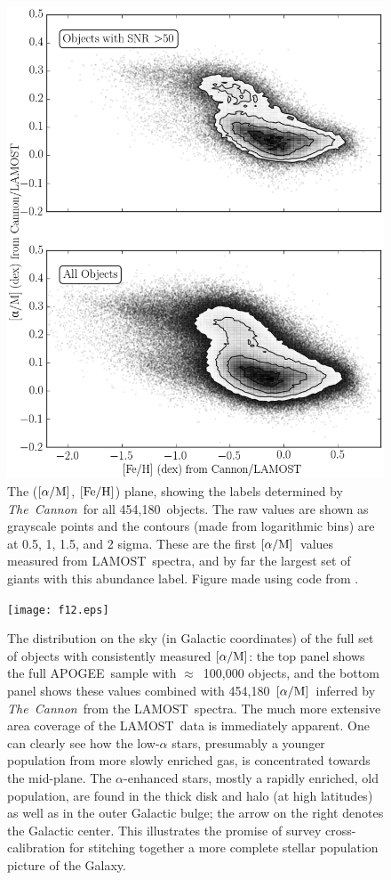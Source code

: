 \documentclass[12pt, letterpaper, preprint]{aastex}
\newcommand{\tc}{\textsl{The~Cannon}}
\newcommand{\apogee}{APOGEE}
\newcommand{\lamost}{LAMOST}
\newcommand{\feh}{\mbox{$\rm [Fe/H]$}}
\newcommand{\alpham}{\mbox{$\rm [\alpha/M]$}}
\newcommand{\nallobj}{454,180}
\begin{document}
\begin{figure}[H]
\centering
\includegraphics[scale=0.7]{f11.eps}
\caption{The (\alpham, \feh) plane, showing the labels  determined by \tc\ for all \nallobj\ objects.
The raw values are shown as grayscale points and
the contours (made from logarithmic bins) are at 0.5, 1, 1.5, and 2 sigma.
These are the first \alpham\ values measured from \lamost\ spectra,
and by far the largest set of giants with this abundance label. Figure made using code from \citet{DanFM}.
}
\label{fig:alpha-feh}
\end{figure}

\begin{figure}[!p]
\centering
\texttt{[image: f12.eps]}
\caption{The distribution on the sky (in Galactic coordinates) of the
full set of objects with consistently measured 
\alpham : 
the top panel shows
the full \apogee\ sample with
$\approx$\, 100,000 objects,
and the bottom panel shows these values
combined with \nallobj\ \alpham\ inferred by
\tc\ from the \lamost\  spectra. 
The much more extensive area coverage of the \lamost\ data is immediately apparent.
One can clearly see how the low-$\alpha$ stars, presumably a younger population from more slowly enriched gas, is concentrated towards the mid-plane.
The $\alpha$-enhanced stars, mostly a rapidly enriched, old population, are found
in the thick disk and halo (at high latitudes) as well as in the outer Galactic bulge;
the arrow on the right denotes the Galactic center.
This illustrates the promise of survey cross-calibration
for stitching together a more complete stellar population picture of the Galaxy.
}
\label{fig:am-map}
\end{figure}
\end{document}
